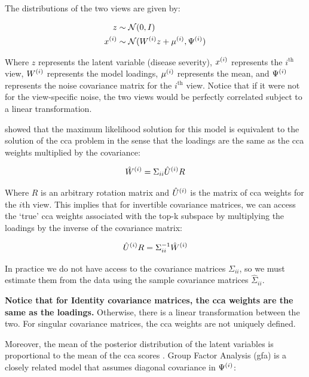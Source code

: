The distributions of the two views are given by:

\begin{align}
    z& \sim \mathcal{N}(0, I)\\
    x^{(i)} & \sim \mathcal{N}(W^{(i)} z + \mu^{(i)}, \Psi^{(i)})
\end{align}

Where \(z\) represents the latent variable (disease severity), \(x^{(i)}\) represents the $i^{\text{th}}$ view, \(W^{(i)}\) represents the model loadings, \(\mu^{(i)}\) represents the mean, and \(\Psi^{(i)}\) represents the noise covariance matrix for the $i^{\text{th}}$ view.
Notice that if it were not for the view-specific noise, the two views would be perfectly correlated subject to a linear transformation.

\citet{bach2005probabilistic} showed that the maximum likelihood solution for this model is equivalent to the solution of the \acrshort{cca} problem in the sense that the \gls{loadings} are the same as the \acrshort{cca} weights multiplied by the covariance:

\begin{align}
    \label{eq:weights-to-loadings}
    \hat{W}^{(i)} = \Sigma_{ii} \hat{U}^{(i)} R
\end{align}

Where $R$ is an arbitrary rotation matrix and $\hat{U}^{(i)}$ is the matrix of \acrshort{cca} weights for the $i$th view.
This implies that for invertible covariance matrices, we can access the `true' \acrshort{cca} weights associated with the top-k subspace by multiplying the \gls{loadings} by the inverse of the covariance matrix:

\begin{align}
    \hat{U}^{(i)}R = \Sigma_{ii}^{-1} \hat{W}^{(i)}
\end{align}

In practice we do not have access to the covariance matrices $\Sigma_{ii}$, so we must estimate them from the data using the sample covariance matrices $\hat{\Sigma}_{ii}$.

\textbf{Notice that for Identity covariance matrices, the \acrshort{cca} weights are the same as the loadings.}
Otherwise, there is a linear transformation between the two.
For singular covariance matrices, the \acrshort{cca} weights are not uniquely defined.

Moreover, the mean of the posterior distribution of the latent variables is proportional to the mean of the \acrshort{cca} scores \citep{klami2013bayesian}.
Group Factor Analysis (\acrshort{gfa}) is a closely related model that assumes diagonal covariance in $\Psi^{(i)}$:

